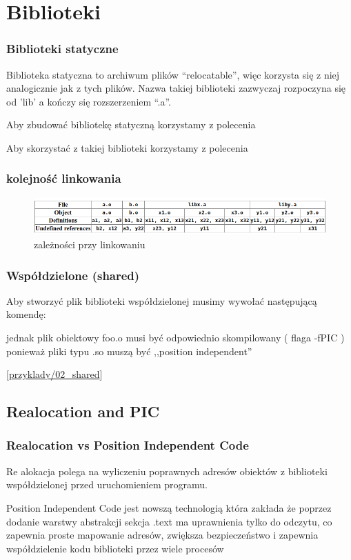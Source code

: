 \section{Biblioteki}

\begin{frame}[t]\frametitle{Biblioteki statyczne}

  Biblioteka statyczna to archiwum plików ``relocatable'', więc korzysta się z
  niej analogicznie jak z tych plików. Nazwa takiej biblioteki zazwyczaj
  rozpoczyna się od 'lib' a kończy się rozszerzeniem ``.a''.

  Aby zbudować bibliotekę statyczną korzystamy z polecenia

  Aby skorzystać z takiej biblioteki korzystamy z polecenia
  
\end{frame}

\begin{frame}[t]\frametitle{kolejność linkowania}
  \begin{figure}
    \includegraphics[width=\textwidth]{staticLib.png}
    \caption{zależności przy linkowaniu \cite{lurklurk}}
  \end{figure}
\end{frame}



\begin{frame}[t]\frametitle{Współdzielone (shared)}
  Aby stworzyć plik biblioteki współdzielonej musimy wywołać następującą komendę:
  

  jednak plik obiektowy foo.o musi być odpowiednio skompilowany ( flaga -fPIC )
  ponieważ pliki typu .so muszą być ,,position independent''

  [\url{przyklady/02_shared}]
\end{frame}

\subsection{Realocation and PIC}
\begin{frame}[t]\frametitle{Realocation vs Position Independent Code}
  \begin{alertblock}{Re alokacja} polega na wyliczeniu poprawnych adresów obiektów z biblioteki
    współdzielonej przed uruchomieniem programu.
  \end{alertblock}

  \begin{alertblock}{Position Independent Code} jest nowszą technologią która zakłada że poprzez
    dodanie warstwy abstrakcji sekcja .text ma uprawnienia tylko do odczytu, co
    zapewnia proste mapowanie adresów, zwiększa bezpieczeństwo i zapewnia
    współdzielenie kodu biblioteki przez wiele procesów
  \end{alertblock}
\end{frame}
